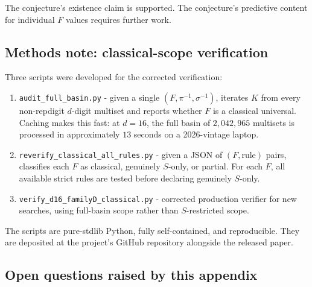 \documentclass[11pt,letterpaper]{article}
\theoremstyle{paperstyle}
\theoremstyle{paperstyledef}
\theoremstyle{paperstylerem}
\begin{document}
The conjecture's existence claim is supported. The conjecture's
predictive content for individual \(F\) values requires further work.

\hypertarget{g.7-methods-note-classical-scope-verification}{%
\subsection{Methods note: classical-scope verification}\label{g.7-methods-note-classical-scope-verification}}

Three scripts were developed for the corrected verification:

\begin{enumerate}
\def\labelenumi{\arabic{enumi}.}
\item
  \texttt{audit\_full\_basin.py} - given a single
  \((F, \pi^{-1}, \sigma^{-1})\), iterates \(K\) from every non-repdigit
  \(d\)-digit multiset and reports whether \(F\) is a classical
  universal. Caching makes this fast: at \(d = 16\), the full basin of
  \(2{,}042{,}965\) multisets is processed in approximately \(13\)
  seconds on a 2026-vintage laptop.
\item
  \texttt{reverify\_classical\_all\_rules.py} - given a JSON of
  \((F, \mathrm{rule})\) pairs, classifies each \(F\) as classical,
  genuinely \(S\)-only, or partial. For each \(F\), all available strict
  rules are tested before declaring genuinely \(S\)-only.
\item
  \texttt{verify\_d16\_familyD\_classical.py} - corrected production
  verifier for new searches, using full-basin scope rather than
  \(S\)-restricted scope.
\end{enumerate}

The scripts are pure-stdlib Python, fully self-contained, and
reproducible. They are deposited at the project's GitHub repository
alongside the released paper.

\hypertarget{g.8-open-questions-raised-by-this-appendix}{%
\subsection{Open questions raised by this appendix}\label{g.8-open-questions-raised-by-this-appendix}}
\end{document}
